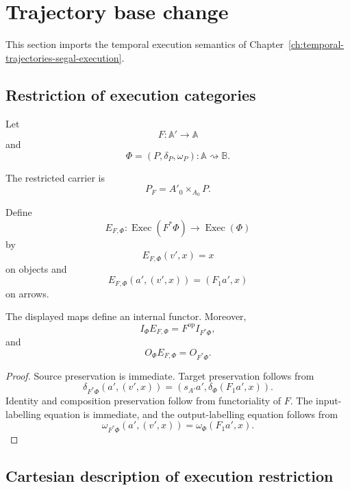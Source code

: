 \section{Trajectory base change}
\label{sec:trajectory-base-change}

This section imports the temporal execution semantics of
Chapter~\ref{ch:temporal-trajectories-segal-execution}.

\subsection{Restriction of execution categories}
\label{subsec:restriction-execution-categories}

Let
\[
    F:\mathbb A'\to\mathbb A
\]
and
\[
    \Phi=(P,\delta_P,\omega_P):
    \mathbb A\rightsquigarrow\mathbb B.
\]

The restricted carrier is
\[
    P_F=A'_0\times_{A_0}P.
\]

Define
\[
    E_{F,\Phi}:
    \operatorname{Exec}(F^\ast\Phi)
    \to
    \operatorname{Exec}(\Phi)
\]
by
\[
    E_{F,\Phi}(v',x)=x
\]
on objects and
\[
    E_{F,\Phi}(a',(v',x))
    =
    (F_1a',x)
\]
on arrows.

\begin{proposition}
\label{prop:execution-restriction-functor-rigorous}
The displayed maps define an internal functor. Moreover,
\[
    I_\Phi E_{F,\Phi}
    =
    F^{\mathrm{op}}I_{F^\ast\Phi},
\]
and
\[
    O_\Phi E_{F,\Phi}
    =
    O_{F^\ast\Phi}.
\]
\end{proposition}

\begin{proof}
Source preservation is immediate. Target preservation follows from
\[
    \delta_{F^\ast\Phi}(a',(v',x))
    =
    \left(
        s_{A'}a',
        \delta_\Phi(F_1a',x)
    \right).
\]
Identity and composition preservation follow from functoriality of \(F\).
The input-labelling equation is immediate, and the output-labelling equation
follows from
\[
    \omega_{F^\ast\Phi}(a',(v',x))
    =
    \omega_\Phi(F_1a',x).
\]
\end{proof}

\subsection{Cartesian description of execution restriction}
\label{subsec:cartesian-description-execution-restriction}


